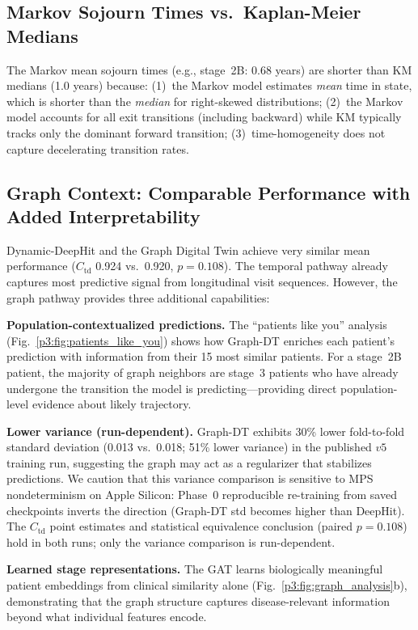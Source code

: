 \subsection{Markov Sojourn Times vs.\ Kaplan-Meier Medians}

The Markov mean sojourn times (e.g., stage~2B: 0.68 years) are shorter than KM medians (1.0 years) because: (1)~the Markov model estimates \textit{mean} time in state, which is shorter than the \textit{median} for right-skewed distributions; (2)~the Markov model accounts for all exit transitions (including backward) while KM typically tracks only the dominant forward transition; (3)~time-homogeneity does not capture decelerating transition rates.

\subsection{Graph Context: Comparable Performance with Added Interpretability}

Dynamic-DeepHit and the Graph Digital Twin achieve very similar mean performance ($C_\text{td}$ 0.924 vs.\ 0.920, $p{=}0.108$). The temporal pathway already captures most predictive signal from longitudinal visit sequences. However, the graph pathway provides three additional capabilities:

\textbf{Population-contextualized predictions.} The ``patients like you'' analysis (Fig.~\ref{p3:fig:patients_like_you}) shows how Graph-DT enriches each patient's prediction with information from their 15 most similar patients. For a stage~2B patient, the majority of graph neighbors are stage~3 patients who have already undergone the transition the model is predicting---providing direct population-level evidence about likely trajectory.

\textbf{Lower variance (run-dependent).} Graph-DT exhibits 30\% lower fold-to-fold standard deviation (0.013 vs.\ 0.018; 51\% lower variance) in the published $v5$ training run, suggesting the graph may act as a regularizer that stabilizes predictions. We caution that this variance comparison is sensitive to MPS nondeterminism on Apple Silicon: Phase~0 reproducible re-training from saved checkpoints inverts the direction (Graph-DT std becomes higher than DeepHit). The $C_\text{td}$ point estimates and statistical equivalence conclusion (paired $p{=}0.108$) hold in both runs; only the variance comparison is run-dependent.

\textbf{Learned stage representations.} The GAT learns biologically meaningful patient embeddings from clinical similarity alone (Fig.~\ref{p3:fig:graph_analysis}b), demonstrating that the graph structure captures disease-relevant information beyond what individual features encode.

